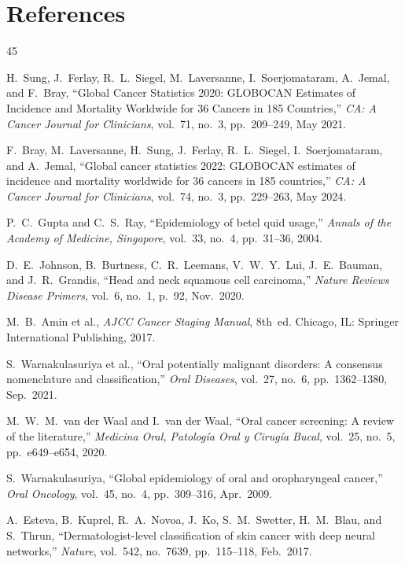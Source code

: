 \documentclass[12pt,a4paper,oneside]{report}
\begin{document}
\chapter*{References}
\begin{thebibliography}{45}

H.~Sung, J.~Ferlay, R.~L.~Siegel, M.~Laversanne, I.~Soerjomataram, A.~Jemal, and F.~Bray, ``Global Cancer Statistics 2020: GLOBOCAN Estimates of Incidence and Mortality Worldwide for 36 Cancers in 185 Countries,'' \textit{CA: A Cancer Journal for Clinicians}, vol.~71, no.~3, pp.~209--249, May 2021.

F.~Bray, M.~Laversanne, H.~Sung, J.~Ferlay, R.~L.~Siegel, I.~Soerjomataram, and A.~Jemal, ``Global cancer statistics 2022: GLOBOCAN estimates of incidence and mortality worldwide for 36 cancers in 185 countries,'' \textit{CA: A Cancer Journal for Clinicians}, vol.~74, no.~3, pp.~229--263, May 2024.

P.~C.~Gupta and C.~S.~Ray, ``Epidemiology of betel quid usage,'' \textit{Annals of the Academy of Medicine, Singapore}, vol.~33, no.~4, pp.~31--36, 2004.

D.~E.~Johnson, B.~Burtness, C.~R.~Leemans, V.~W.~Y.~Lui, J.~E.~Bauman, and J.~R.~Grandis, ``Head and neck squamous cell carcinoma,'' \textit{Nature Reviews Disease Primers}, vol.~6, no.~1, p.~92, Nov.~2020.

M.~B.~Amin et al., \textit{AJCC Cancer Staging Manual}, 8th~ed. Chicago, IL: Springer International Publishing, 2017.

S.~Warnakulasuriya et al., ``Oral potentially malignant disorders: A consensus nomenclature and classification,'' \textit{Oral Diseases}, vol.~27, no.~6, pp.~1362--1380, Sep.~2021.

M.~W.~M.~van der Waal and I.~van der Waal, ``Oral cancer screening: A review of the literature,'' \textit{Medicina Oral, Patolog\'{i}a Oral y Cirug\'{i}a Bucal}, vol.~25, no.~5, pp.~e649--e654, 2020.

S.~Warnakulasuriya, ``Global epidemiology of oral and oropharyngeal cancer,'' \textit{Oral Oncology}, vol.~45, no.~4, pp.~309--316, Apr.~2009.

A.~Esteva, B.~Kuprel, R.~A.~Novoa, J.~Ko, S.~M.~Swetter, H.~M.~Blau, and S.~Thrun, ``Dermatologist-level classification of skin cancer with deep neural networks,'' \textit{Nature}, vol.~542, no.~7639, pp.~115--118, Feb.~2017.


\end{thebibliography}
\end{document}
